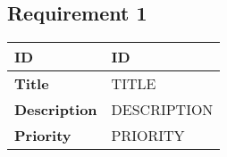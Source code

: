 \subsection{Requirement 1}

\begin{table}[H]
    \begin{tabularx}{\textwidth}{|l|l|}
        \textbf{ID} & ID \\ \hline
        \textbf{Title} & TITLE \\ \hline
        \textbf{Description} & DESCRIPTION \\ \hline
        \textbf{Priority} & PRIORITY \\\hline
    \end{tabularx}
\end{table}
